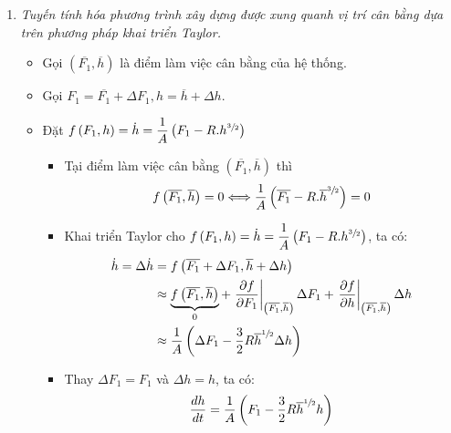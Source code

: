 \begin{enumerate}[\it a.]
        \item \textit{Tuyến tính hóa phương trình xây dựng được xung quanh vị trí cân bằng dựa trên phương pháp khai triển Taylor.}
            \begin{itemize}
                \item Gọi $\left({\overline{F_1}, \overline{h}}\right)$ là điểm làm việc cân bằng của hệ thống.

                \item Gọi $F_1 = \overline{F_1} + \Delta F_1, h = \overline{h} + \Delta h$.

                \item Đặt $f\left({F_1, h}\right) = \dot{h} = \dfrac{1}{A} \left({F_1 - R.h^{\sfrac{3}{2}}}\right)$
                    \begin{itemize}
                        \item Tại điểm làm việc cân bằng $\left({\overline{F_1}, \overline{h}}\right)$ thì
                            \begin{align}
                                f\left({\overline{F_1}, \overline{h}}\right) = 0 \Longleftrightarrow \dfrac{1}{A} \left({\overline{F_1} - R.\overline{h}^{\sfrac{3}{2}}}\right) = 0
                            \end{align}

                        \item Khai triển Taylor cho $f \left({F_1, h}\right) = \dot{h} = \dfrac{1}{A} \left({F_1 - R.h^{\sfrac{3}{2}}}\right)$, ta có:
                            \begin{align}
                                \dot{h} = \Delta \dot{h} & = f\left({\overline{F_1} + \Delta F_1, \overline{h} + \Delta h}\right) \\
                                & \approx \underbrace{f \left({\overline{F_1}, \overline{h}}\right)}_{0} + \left.\dfrac{\partial f}{\partial F_1}\right|_{\left({\overline{F_1}, \overline{h}}\right)} \Delta F_1 + \left.\dfrac{\partial f}{\partial h}\right|_{\left({\overline{F_1}, \overline{h}}\right)} \Delta h\\
                                & \approx \dfrac{1}{A} \left({\Delta F_1 - \dfrac{3}{2} R \overline{h}^{\sfrac{1}{2}} \Delta h}\right)
                            \end{align}

                        \item Thay $\Delta F_1 = F_1$ và $\Delta h = h$, ta có:
                            \begin{align}
                                \dfrac{dh}{dt} = \dfrac{1}{A} \left({F_1 - \dfrac{3}{2} R \overline{h}^{\sfrac{1}{2}} h}\right)
                            \end{align}
                    \end{itemize}


\end{itemize}
\end{enumerate}
